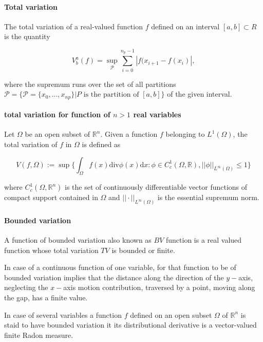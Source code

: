 \paragraph{Total variation}


The total variation of a real-valued function $f$ defined on an interval $[a,b]\subset R$ is the quantity 

\begin{equation}
V_b ^a (f) = \sup_{\mathcal{P}}\sum_{i=0}^{n_p -1}|f(x_{i+1} - f(x_i)|,
\end{equation}

where the supremum runs over the set of all partitions $\mathcal{P} = \{\mathcal{P}=\{x_0,...,x_{np}\}|P\text{ is the partition of }[a,b]\}$ of the given interval. 


\paragraph{total variation for function of $n>1$ real variables}


Let $\Omega$ be an open subset of $\mathbb{R}^n$. 
Given a function $f$ belonging to $L^1(\Omega)$, the total variation of $f$ in $\Omega$ is defined as 

\begin{equation}
V(f,\Omega):=\sup\Bigg\{\int_{\Omega}f(x)\text{div}\phi(x)\text{d}x:\phi\in C_{c}^1(\Omega, \mathbb{R}), ||\phi||_{L^{\infty}(\Omega)}\leq 1\Bigg\}
\end{equation}

where $C_c ^1(\Omega, \mathbb{R}^n)$ is the set of continuously differentiable vector functions of compact support contained in $\Omega$ and $||\cdot||_{L^{\infty}(\Omega)}$ is the essential supremum norm. 


\paragraph{Bounded variation}


A function of bounded variation also known as $BV$ function is a real valued function whose total variation $TV$ is bounded or finite. 

In case of a continuous function of one variable, for that function to be of bounded variation implies that the distance along the direction of the $y-$axis, neglecting the $x-$axis motion contribution, traversed by a point, moving along the gap, has a finite value. 

In case of several variables a function $f$ defined on an open subset $\Omega$ of $\mathbb{R}^n$ is staid to have bounded variation it its distributional derivative is a vector-valued finite Radon measure.

